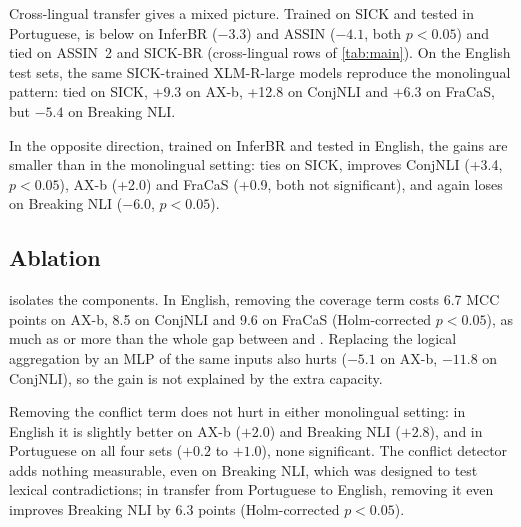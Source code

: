 Cross-lingual transfer gives a mixed picture. Trained on SICK and tested in Portuguese, \model{} is
below \cls{} on InferBR ($-3.3$) and ASSIN ($-4.1$, both $p<0.05$) and tied on ASSIN~2 and SICK-BR
(cross-lingual rows of \cref{tab:main}). On the English test sets, the same SICK-trained XLM-R-large models reproduce the
monolingual pattern: tied on SICK, +9.3 on AX-b, +12.8 on ConjNLI and +6.3 on FraCaS, but $-5.4$ on
Breaking NLI.

In the opposite direction, trained on InferBR and tested in English, the gains are smaller than in
the monolingual setting: \model{} ties \cls{} on SICK, improves ConjNLI (+3.4, $p<0.05$), AX-b (+2.0) and
FraCaS (+0.9, both not significant), and again loses on Breaking NLI ($-6.0$, $p<0.05$).

\subsection{Ablation}
\label{sec:ablation-results}

\begin{table}[t]
  \centering\footnotesize\setlength{\tabcolsep}{3pt}
  
  \caption{Ablation (binary MCC $\times100$): full model, then mean paired difference to it (decreases in
  red; variants in \cref{sec:ablations}). $-$\,lexicon: removes all lexical resources, or only the one named (the full model uses WordNet or PT-LKB, plus Wiktionary).
  $^{*}$Holm-corrected (within each block) and $^{\dagger}$uncorrected paired Wilcoxon $p<0.05$ against
  the full model. }
  \label{tab:ablation}
\end{table}

 isolates the components. In English, removing the coverage term costs 6.7 MCC
points on AX-b, 8.5 on ConjNLI and 9.6 on FraCaS (Holm-corrected $p<0.05$), as much as or more than the
whole gap between \model{} and \cls{}. Replacing the logical aggregation by an MLP of the same inputs
also hurts ($-5.1$ on AX-b, $-11.8$ on ConjNLI), so the gain is not explained by the extra capacity.

Removing the conflict term does not hurt in either monolingual setting: in English it is slightly better on AX-b
($+2.0$) and Breaking NLI ($+2.8$), and in Portuguese on all four sets ($+0.2$ to $+1.0$), none
significant. The conflict detector adds nothing measurable, even on Breaking NLI, which was designed to
test lexical contradictions; in transfer from Portuguese to English, removing it even improves Breaking NLI
by 6.3 points (Holm-corrected $p<0.05$).

